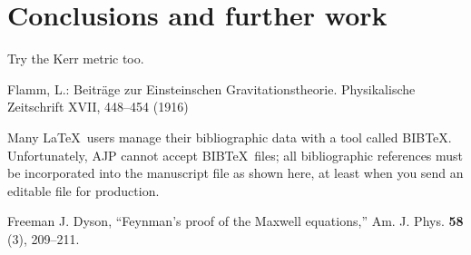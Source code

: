 \documentclass[prb,preprint]{revtex4-1}
\begin{document}
\section{Conclusions and further work}


Try the Kerr metric too.


\begin{thebibliography}{99}

 Flamm, L.: Beitr\"{a}ge zur Einsteinschen
  Gravitationstheorie.  Physikalische Zeitschrift XVII, 448–454 (1916)
  
 Many \LaTeX\ users manage their bibliographic data with 
a tool called BIB\TeX.  Unfortunately, AJP cannot accept BIB\TeX\ files; all 
bibliographic references must be incorporated into the manuscript file
as shown here, at least when you send an editable file for production.

 Freeman J. Dyson, ``Feynman's proof of the Maxwell equations,''
Am. J. Phys. \textbf{58} (3), 209--211.  



\end{thebibliography}



\end{document}
